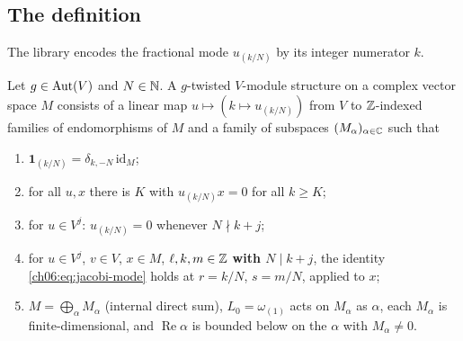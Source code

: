 \subsection{The definition}

The library encodes the fractional mode $u_{(k/N)}$ by its integer numerator $k$.

\begin{definition}\label{ch06:def:tm}
Let $g\in\operatorname{Aut}(V)$ and $N\in{\mathbb{N}}$.  A $g$-twisted $V$-module structure on a complex vector space
$M$ consists of a linear map $u\mapsto(k\mapsto u_{(k/N)})$ from $V$ to ${\mathbb{Z}}$-indexed families of
endomorphisms of $M$ and a family of subspaces $(M_\alpha)_{\alpha\in{\mathbb{C}}}$ such that
\begin{enumerate}[label=(\roman*)]
\item $\mathbf 1_{(k/N)}=\delta_{k,-N}\,\mathrm{id}_M$;
\item for all $u,x$ there is $K$ with $u_{(k/N)}x=0$ for all $k\ge K$;
\item for $u\in V^j$: $u_{(k/N)}=0$ whenever $N\nmid k+j$;
\item for $u\in V^j$, $v\in V$, $x\in M$, $\ell,k,m\in{\mathbb{Z}}$ \textbf{with $N\mid k+j$}, the identity
  \eqref{ch06:eq:jacobi-mode} holds at $r=k/N$, $s=m/N$, applied to $x$;
\item $M=\bigoplus_\alpha M_\alpha$ (internal direct sum), $L_0=\omega_{(1)}$ acts on $M_\alpha$ as
  $\alpha$, each $M_\alpha$ is finite-dimensional, and $\operatorname{Re}\alpha$ is bounded below on
  the $\alpha$ with $M_\alpha\ne0$.
\end{enumerate}
\end{definition}

